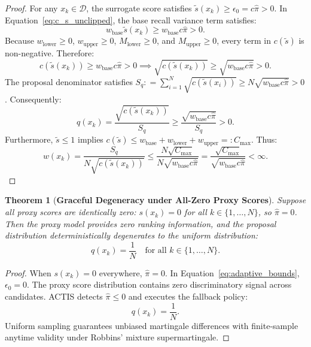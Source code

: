 \documentclass[11pt,a4paper]{article}
\newcommand{\coloneqq}{\mathrel{\mathop:}=}
\newcommand{\eqqcolon}{=\mathrel{\mathop:}}
\newcommand{\D}{\mathcal{D}}
\newtheorem{theorem}{Theorem}
\begin{document}
\begin{proof}
For any $x_k \in \D$, the surrogate score satisfies $\tilde{s}(x_k) \ge \epsilon_0 = c \hat{\pi} > 0$.
In Equation~\eqref{eq:c_s_unclipped}, the base recall variance term satisfies:
\begin{equation}
w_{\text{base}} \tilde{s}(x_k) \ge w_{\text{base}} c \hat{\pi} > 0.
\end{equation}
Because $w_{\text{lower}} \ge 0$, $w_{\text{upper}} \ge 0$, $M_{\text{lower}} \ge 0$, and $M_{\text{upper}} \ge 0$, every term in $c(\tilde{s})$ is non-negative. Therefore:
\begin{equation}
c(\tilde{s}(x_k)) \ge w_{\text{base}} c \hat{\pi} > 0 \implies \sqrt{c(\tilde{s}(x_k))} \ge \sqrt{w_{\text{base}} c \hat{\pi}} > 0.
\end{equation}
The proposal denominator satisfies $S_q \coloneqq \sum_{i=1}^N \sqrt{c(\tilde{s}(x_i))} \ge N \sqrt{w_{\text{base}} c \hat{\pi}} > 0$.
Consequently:
\begin{equation}
q(x_k) = \frac{\sqrt{c(\tilde{s}(x_k))}}{S_q} \ge \frac{\sqrt{w_{\text{base}} c \hat{\pi}}}{S_q} > 0.
\end{equation}
Furthermore, $\tilde{s} \le 1$ implies $c(\tilde{s}) \le w_{\text{base}} + w_{\text{lower}} + w_{\text{upper}} \eqqcolon C_{\max}$. Thus:
\begin{equation}
w(x_k) = \frac{S_q}{N \sqrt{c(\tilde{s}(x_k))}} \le \frac{N \sqrt{C_{\max}}}{N \sqrt{w_{\text{base}} c \hat{\pi}}} = \frac{\sqrt{C_{\max}}}{\sqrt{w_{\text{base}} c \hat{\pi}}} < \infty.
\end{equation}
\end{proof}

\begin{theorem}[\textbf{Graceful Degeneracy under All-Zero Proxy Scores}]\label{thm:degeneracy}
Suppose all proxy scores are identically zero: $s(x_k) = 0$ for all $k \in \{1, \dots, N\}$, so $\hat{\pi} = 0$.
Then the proxy model provides zero ranking information, and the proposal distribution deterministically degenerates to the uniform distribution:
\begin{equation}
q(x_k) = \frac{1}{N} \quad \text{for all } k \in \{1, \dots, N\}.
\end{equation}
\end{theorem}

\begin{proof}
When $s(x_k) = 0$ everywhere, $\hat{\pi} = 0$. In Equation~\eqref{eq:adaptive_bounds}, $\epsilon_0 = 0$. 
The proxy score distribution contains zero discriminatory signal across candidates. ACTIS detects $\hat{\pi} \le 0$ and executes the fallback policy:
\begin{equation}
q(x_k) = \frac{1}{N}.
\end{equation}
Uniform sampling guarantees unbiased martingale differences with finite-sample anytime validity under Robbins' mixture supermartingale.
\end{proof}
\end{document}
